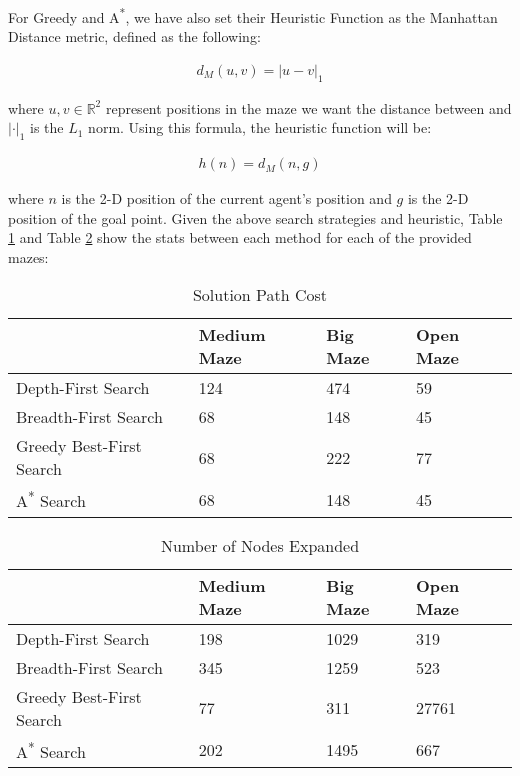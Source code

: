 \documentclass{article}[12pt]
\begin{document}
   For Greedy and A\textsuperscript{*}, we have also set their Heuristic Function as the Manhattan Distance metric, defined as the following:
   
   \begin{align*}
   d_M(u,v) = |u - v|_1
   \end{align*}
   
   where $u, v \in \mathbb{R}^2$ represent positions in the maze we want the distance between and $|\cdot|_1$ is the $L_1$ norm. Using this formula, the heuristic function will be:
   
   \begin{align*}
   h(n) = d_M(n,g)
\end{align*}      
   
   where $n$ is the 2-D position of the current agent's position and $g$ is the 2-D position of the goal point. Given the above search strategies and heuristic, Table \ref{tab:sol11} and Table \ref{tab:nnode11} show the stats between each method for each of the provided mazes:
   
   \begin{table}[ht]
   \centering
   \begin{tabular}{l | l | l | l  }
   \hline
    & Medium Maze & Big Maze & Open Maze\\
    \hline \hline 
   Depth-First Search & 124 & 474 & 59 \\
   Breadth-First Search & 68 & 148 & 45 \\
   Greedy Best-First Search & 68 & 222 & 77 \\
   A\textsuperscript{*} Search & 68 & 148 & 45 \\
   \hline
   \end{tabular}
   \caption{Solution Path Cost} \label{tab:sol11}
   \end{table}
   
   \begin{table}[ht]
   \centering
   \begin{tabular}{l | l | l | l  }
   \hline
    & Medium Maze & Big Maze & Open Maze\\
    \hline \hline 
   Depth-First Search & 198 & 1029 & 319 \\
   Breadth-First Search & 345 & 1259 & 523 \\
   Greedy Best-First Search & 77 & 311 & 27761 \\
   A\textsuperscript{*} Search & 202 & 1495 & 667 \\
   \hline
   \end{tabular}
   \caption{Number of Nodes Expanded} \label{tab:nnode11}
   \end{table}
   
\end{document}
